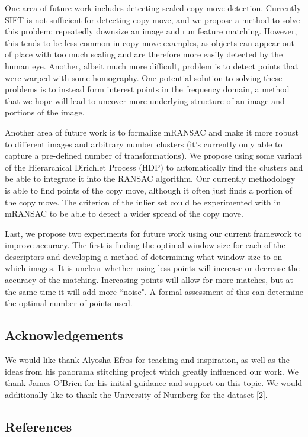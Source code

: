 \documentclass[12pt]{article}
\begin{document}
One area of future work includes detecting scaled copy move detection. Currently SIFT is not sufficient for detecting copy move, and we propose a method to solve this problem: repeatedly downsize an image and run feature matching. However, this tends to be less common in copy move examples, as objects can appear out of place with too much scaling and are therefore more easily detected by the human eye. Another, albeit much more difficult, problem is to detect points that were warped with some homography. One potential solution to solving these problems is to instead form interest points in the frequency domain, a method that we hope will lead to uncover more underlying structure of an image and portions of the image. 

Another area of future work is to formalize mRANSAC and make it more robust to different images and arbitrary number clusters (it's currently only able to capture a pre-defined number of transformations). We propose using some variant of the Hierarchical Dirichlet Process (HDP) to automatically find the clusters and be able to integrate it into the RANSAC algorithm. Our currently methodology is able to find points of the copy move, although it often just finds a portion of the copy move. The criterion of the inlier set could be experimented with in mRANSAC to be able to detect a wider spread of the copy move.

Last, we propose two experiments for future work using our current framework to improve accuracy. The first is finding the optimal window size for each of the descriptors and developing a method of determining what window size to on which images. It is unclear whether using less points will increase or decrease the accuracy of the matching. Increasing points will allow for more matches, but at the same time it will add more ``noise". A formal assessment of this can determine the optimal number of points used. 

\subsection*{Acknowledgements}

We would like thank Alyosha Efros for teaching and inspiration, as well as the ideas from his panorama stitching project which greatly influenced our work. We thank James O'Brien for his initial guidance and support on this topic. We would additionally like to thank the University of Nurnberg for the dataset [2].

\subsection*{References}
\end{document}
